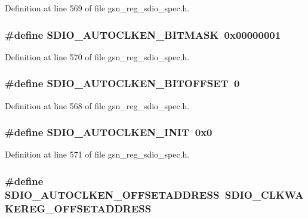 Definition at line 569 of file gsn\_\-reg\_\-sdio\_\-spec.h.

\hypertarget{a00571_a31453275fbd3fcf04d80a27df5641f7c}{
\subsubsection[{SDIO\_\-AUTOCLKEN\_\-BITMASK}]{\setlength{\rightskip}{0pt plus 5cm}\#define SDIO\_\-AUTOCLKEN\_\-BITMASK~0x00000001}}
\label{a00571_a31453275fbd3fcf04d80a27df5641f7c}


Definition at line 570 of file gsn\_\-reg\_\-sdio\_\-spec.h.

\hypertarget{a00571_a9aef1c46516f7782db6bcd639156cbba}{
\subsubsection[{SDIO\_\-AUTOCLKEN\_\-BITOFFSET}]{\setlength{\rightskip}{0pt plus 5cm}\#define SDIO\_\-AUTOCLKEN\_\-BITOFFSET~0}}
\label{a00571_a9aef1c46516f7782db6bcd639156cbba}


Definition at line 568 of file gsn\_\-reg\_\-sdio\_\-spec.h.

\hypertarget{a00571_a9f4cbd964813ff7975386565ab17fcda}{
\subsubsection[{SDIO\_\-AUTOCLKEN\_\-INIT}]{\setlength{\rightskip}{0pt plus 5cm}\#define SDIO\_\-AUTOCLKEN\_\-INIT~0x0}}
\label{a00571_a9f4cbd964813ff7975386565ab17fcda}


Definition at line 571 of file gsn\_\-reg\_\-sdio\_\-spec.h.

\hypertarget{a00571_a9713101baf9b8b08e627b23677d41e24}{
\subsubsection[{SDIO\_\-AUTOCLKEN\_\-OFFSETADDRESS}]{\setlength{\rightskip}{0pt plus 5cm}\#define SDIO\_\-AUTOCLKEN\_\-OFFSETADDRESS~SDIO\_\-CLKWAKEREG\_\-OFFSETADDRESS}}
\label{a00571_a9713101baf9b8b08e627b23677d41e24}


